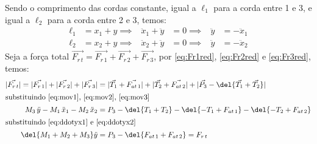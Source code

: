 \documentclass[]{IMTexam}
\begin{document}
\begin{questions}
\begin{parts}
\begin{solution}
\begin{multi}[3]
			\end{multi}

			Sendo o comprimento das cordas constante, igual a $ \ell_1 $ para a corda entre 1 e 3, e igual a $ \ell_2 $ para a corda entre 2 e 3, temos:
			\begin{align}
				\ell_1 & =x_1+y\implies & \ddot{x}_1+\ddot{y} & =0\implies & \ddot{y} & =-\ddot{x}_1\label{eq:ddotyx1} \\
				\ell_2 & =x_2+y\implies & \ddot{x}_2+\ddot{y} & =0\implies & \ddot{y} & =-\ddot{x}_2\label{eq:ddotyx2}
			\end{align}
			Seja a força total $ \vec{F_{r\,t}}=\vec{F_{r\,1}}+\vec{F_{r\,2}}+\vec{F_{r\,3}} $, por \ref{eq:Fr1red}, \ref{eq:Fr2red} e \ref{eq:Fr3red}, temos:
			\begin{align}
				|\vec{F_{r\,t}}|=|\vec{F_{r\,1}}|+|\vec{F_{r\,2}}|+|\vec{F_{r\,3}}| & =|\vec{T_1}+\vec{F_{at\,1}}|+|\vec{T_2}+\vec{F_{at\,2}}|+|\vec{P_3}-\del{\vec{T_1}+\vec{T_2}}| \\
				\intertext{substituindo \ref{eq:mov1}, \ref{eq:mov2}, \ref{eq:mov3}}
				M_3\,\ddot{y}-M_1\,\ddot{x}_1-M_2\,\ddot{x}_2                       & =P_3-\del{T_1+T_2}-\del{-T_1+F_{at\,1}}-\del{-T_2+F_{at\,2}}\nonumber                          \\
				\intertext{substituindo \ref{eq:ddotyx1} e \ref{eq:ddotyx2}}
				\del{M_1+M_2+M_3}\ddot{y}                                           & =P_3-\del{F_{at\,1}+F_{at\,2}}=F_{r\,t}\label{eq:FmaFinal}
			\end{align}
		\end{solution}


\end{parts}
\end{questions}
\end{document}
